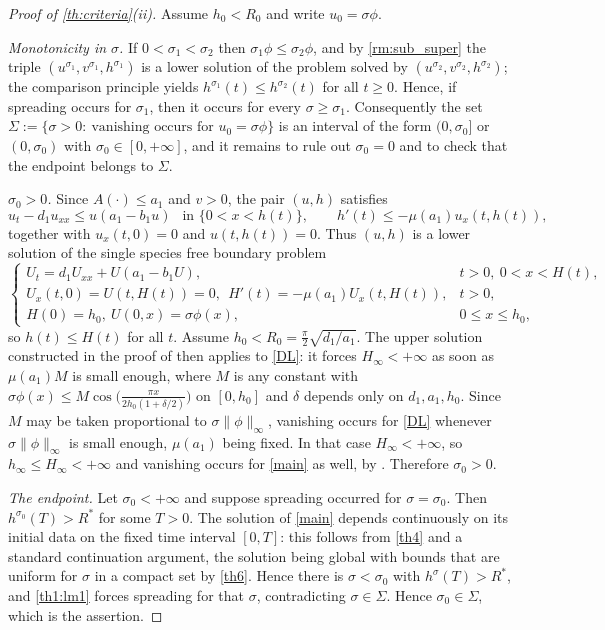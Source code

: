 \documentclass[reqno]{amsart}
\theoremstyle{plain}
\theoremstyle{definition}
\theoremstyle{remark}
\begin{document}
\begin{proof}[Proof of \cref{th:criteria}(ii)]
	Assume $h_0<R_0$ and write $u_0=\sigma\phi$.

	\textit{Monotonicity in $\sigma$.} If $0<\sigma_1<\sigma_2$ then
	$\sigma_1\phi\le\sigma_2\phi$, and by \cref{rm:sub_super} the triple
	$(u^{\sigma_1},v^{\sigma_1},h^{\sigma_1})$ is a lower solution of the problem
	solved by $(u^{\sigma_2},v^{\sigma_2},h^{\sigma_2})$; the comparison principle
	yields $h^{\sigma_1}(t)\le h^{\sigma_2}(t)$ for all $t\ge0$. Hence, if
	spreading occurs for $\sigma_1$, then it occurs for every $\sigma\ge\sigma_1$.
	Consequently the set
	$\Sigma:=\{\sigma>0:\ \text{vanishing occurs for } u_0=\sigma\phi\}$ is an
	interval of the form $(0,\sigma_0]$ or $(0,\sigma_0)$ with
	$\sigma_0\in[0,+\infty]$, and it remains to rule out $\sigma_0=0$ and to check
	that the endpoint belongs to $\Sigma$.

	\textit{$\sigma_0>0$.} Since $A(\cdot)\le a_1$ and $v>0$, the pair $(u,h)$
	satisfies
	\[
	u_t-d_1u_{xx}\le u(a_1-b_1u)\ \ \text{ in }\{0<x<h(t)\},\qquad
	h'(t)\le -\mu(a_1)u_x(t,h(t)),
	\]
	together with $u_x(t,0)=0$ and $u(t,h(t))=0$. Thus $(u,h)$ is a lower solution
	of the single species free boundary problem
	\begin{equation}\label{DL}
		\begin{cases}
			U_t = d_1U_{xx}+U(a_1-b_1U), & t>0,\ 0<x<H(t),\\
			U_x(t,0)=U(t,H(t))=0,\ \ H'(t)=-\mu(a_1)U_x(t,H(t)), & t>0,\\
			H(0)=h_0,\ U(0,x)=\sigma\phi(x), & 0\le x\le h_0,
		\end{cases}
	\end{equation}
	so $h(t)\le H(t)$ for all $t$. Assume
	$h_0<R_0=\frac{\pi}{2}\sqrt{d_1/a_1}$. The upper solution constructed in the
	proof of \cite[Lemma 3.8]{MR2607347} then applies to \eqref{DL}: it forces
	$H_\infty<+\infty$ as soon as $\mu(a_1)M$ is small enough, where $M$ is any
	constant with $\sigma\phi(x)\le M\cos\big(\frac{\pi x}{2h_0(1+\delta/2)}\big)$
	on $[0,h_0]$ and $\delta$ depends only on $d_1,a_1,h_0$. Since $M$ may be
	taken proportional to $\sigma\|\phi\|_{\infty}$, vanishing occurs for
	\eqref{DL} whenever $\sigma\|\phi\|_{\infty}$ is small enough, $\mu(a_1)$
	being fixed. In that case $H_\infty<+\infty$, so
	$h_\infty\le H_\infty<+\infty$ and vanishing occurs for \eqref{main} as well,
	by \cite[Lemma 3.1]{MR2607347}. Therefore $\sigma_0>0$.

	\textit{The endpoint.} Let $\sigma_0<+\infty$ and suppose spreading occurred
	for $\sigma=\sigma_0$. Then $h^{\sigma_0}(T)>R^*$ for some $T>0$. The solution
	of \eqref{main} depends continuously on its initial data on the fixed time
	interval $[0,T]$: this follows from \cref{th4} and a standard continuation
	argument, the solution being global with bounds that are uniform for
	$\sigma$ in a compact set by \cref{th6}. Hence there is
	$\sigma<\sigma_0$ with $h^{\sigma}(T)>R^*$, and
	\cref{th1:lm1} forces spreading for that $\sigma$, contradicting
	$\sigma\in\Sigma$. Hence $\sigma_0\in\Sigma$, which is the assertion.
\end{proof}
\end{document}
